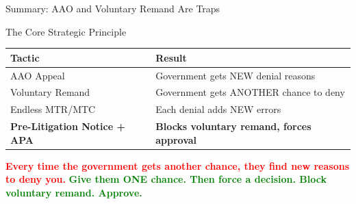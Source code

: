 \documentclass[11pt]{beamer}
\begin{document}
	\begin{frame}{Summary: AAO and Voluntary Remand Are Traps}
		\scriptsize
		\begin{block}{The Core Strategic Principle}
			\centering
			\begin{tabular}{|p{5cm}|p{4cm}|}
				\hline
				\textbf{Tactic} & \textbf{Result} \\
				\hline
				AAO Appeal & Government gets NEW denial reasons \\
				\hline
				Voluntary Remand & Government gets ANOTHER chance to deny \\
				\hline
				Endless MTR/MTC & Each denial adds NEW errors \\
				\hline
				\textbf{Pre-Litigation Notice + APA} & \textbf{Blocks voluntary remand, forces approval} \\
				\hline
			\end{tabular}
			\vspace{0.3cm}
			\textcolor{red}{\textbf{Every time the government gets another chance, they find new reasons to deny you.}}
			\vspace{0.2cm}
			\textcolor{green}{\textbf{Give them ONE chance. Then force a decision. Block voluntary remand. Approve.}}
		\end{block}
	\end{frame}
	
\end{document}
